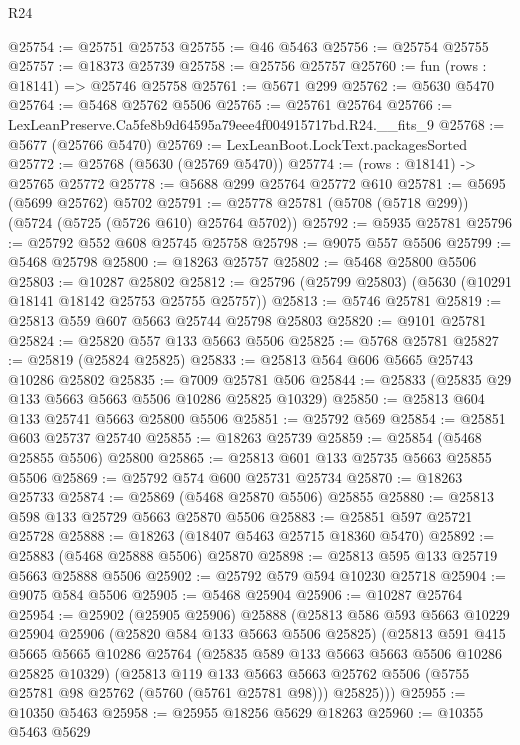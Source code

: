 \begin{lexlean}{R24}
\begin{coremodule}
@25754 := @25751 @25753
@25755 := @46 @5463
@25756 := @25754 @25755
@25757 := @18373 @25739
@25758 := @25756 @25757
@25760 := fun (rows : @18141) => @25746 @25758
@25761 := @5671 @299
@25762 := @5630 @5470
@25764 := @5468 @25762 @5506
@25765 := @25761 @25764
@25766 := LexLeanPreserve.Ca5fe8b9d64595a79eee4f004915717bd.R24.__fits_9
@25768 := @5677 (@25766 @5470)
@25769 := LexLeanBoot.LockText.packagesSorted
@25772 := @25768 (@5630 (@25769 @5470))
@25774 := (rows : @18141) -> @25765 @25772
@25778 := @5688 @299 @25764 @25772 @610
@25781 := @5695 (@5699 @25762) @5702
@25791 := @25778 @25781 (@5708 (@5718 @299)) (@5724 (@5725 (@5726 @610) @25764 @5702))
@25792 := @5935 @25781
@25796 := @25792 @552 @608 @25745 @25758
@25798 := @9075 @557 @5506
@25799 := @5468 @25798
@25800 := @18263 @25757
@25802 := @5468 @25800 @5506
@25803 := @10287 @25802
@25812 := @25796 (@25799 @25803) (@5630 (@10291 @18141 @18142 @25753 @25755 @25757))
@25813 := @5746 @25781
@25819 := @25813 @559 @607 @5663 @25744 @25798 @25803
@25820 := @9101 @25781
@25824 := @25820 @557 @133 @5663 @5506
@25825 := @5768 @25781
@25827 := @25819 (@25824 @25825)
@25833 := @25813 @564 @606 @5665 @25743 @10286 @25802
@25835 := @7009 @25781 @506
@25844 := @25833 (@25835 @29 @133 @5663 @5663 @5506 @10286 @25825 @10329)
@25850 := @25813 @604 @133 @25741 @5663 @25800 @5506
@25851 := @25792 @569
@25854 := @25851 @603 @25737 @25740
@25855 := @18263 @25739
@25859 := @25854 (@5468 @25855 @5506) @25800
@25865 := @25813 @601 @133 @25735 @5663 @25855 @5506
@25869 := @25792 @574 @600 @25731 @25734
@25870 := @18263 @25733
@25874 := @25869 (@5468 @25870 @5506) @25855
@25880 := @25813 @598 @133 @25729 @5663 @25870 @5506
@25883 := @25851 @597 @25721 @25728
@25888 := @18263 (@18407 @5463 @25715 @18360 @5470)
@25892 := @25883 (@5468 @25888 @5506) @25870
@25898 := @25813 @595 @133 @25719 @5663 @25888 @5506
@25902 := @25792 @579 @594 @10230 @25718
@25904 := @9075 @584 @5506
@25905 := @5468 @25904
@25906 := @10287 @25764
@25954 := @25902
    (@25905 @25906)
    @25888
    (@25813
      @586
      @593
      @5663
      @10229
      @25904
      @25906
      (@25820 @584 @133 @5663 @5506 @25825)
      (@25813
        @591
        @415
        @5665
        @5665
        @10286
        @25764
        (@25835 @589 @133 @5663 @5663 @5506 @10286 @25825 @10329)
        (@25813
          @119
          @133
          @5663
          @5663
          @25762
          @5506
          (@5755 @25781 @98 @25762 (@5760 (@5761 @25781 @98)))
          @25825)))
@25955 := @10350 @5463
@25958 := @25955 @18256 @5629 @18263
@25960 := @10355 @5463 @5629

\end{coremodule}
\end{lexlean}
